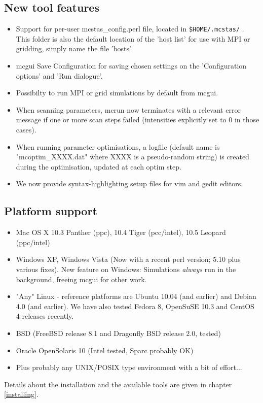 \subsection{New tool features}
\begin{itemize}
  \item Support for per-user mcstas\_config.perl file, located in \verb+$HOME/.mcstas/+ . This folder is also the default
     location of the 'host list' for use with MPI or gridding, simply name the file 'hosts'.
  \item mcgui Save Configuration for saving chosen settings on the 'Configuration options' and 'Run dialogue'.
  \item Possibilty to run MPI or grid simulations by default from mcgui.
  \item When scanning parameters, mcrun now terminates with a relevant error message if one or more scan steps
     failed (intensities explicitly set to 0 in those cases).
  \item When running parameter optimisations, a logfile (default name is "mcoptim\_XXXX.dat" where XXXX is a
     pseudo-random string) is created during the optimisation, updated at each optim step.
  \item We now provide syntax-highlighting setup files for vim and gedit editors.
\end{itemize}
\subsection{Platform support}
\begin{itemize}
\item Mac OS X 10.3 Panther (ppc), 10.4 Tiger (pcc/intel), 10.5 Leopard (ppc/intel)
\item Windows XP,  Windows Vista (Now with a recent perl version; 5.10 plus various fixes). New feature on Windows:
     Simulations \emph{always} run in the background, freeing mcgui for other work.
\item "Any" Linux - reference platforms are Ubuntu 10.04 (and earlier) and Debian 4.0 (and earlier). We have also tested 
  Fedora 8, OpenSuSE 10.3 and CentOS 4 releases recently.
\item BSD (FreeBSD release 8.1 and Dragonfly BSD release 2.0, tested)
\item Oracle OpenSolaris 10 (Intel tested, Sparc probably OK)
\item Plus probably any UNIX/POSIX type environment with a bit of effort...
\end{itemize}
Details about the installation and the available tools are given in chapter \ref{installing}.

